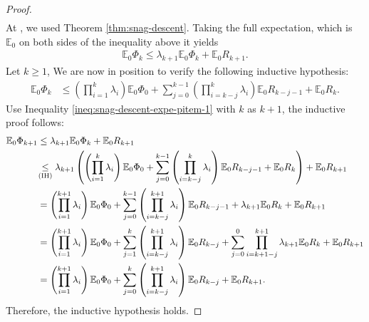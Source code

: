 \documentclass[12pt]{article}
\newcommand{\expect}{\ensuremath{\mathbb E}}
\begin{document}
\begin{proof}
\begin{align*}
            \end{align*}
            At , we used Theorem \ref{thm:snag-descent}. 
            Taking the full expectation, which is $\expect_0$ on both sides of the inequality above it yields 
            \begin{align}\label{ineq:snag-descent-expe-pitem-1}
                \expect_0 \Phi_{k} \le \lambda_{k + 1}\expect_0 \Phi_k + \expect_0 R_{k + 1}. 
            \end{align}
            Let $k \ge 1$, We are now in position to verify the following inductive hypothesis: 
            \begin{align}\tag{IH}
                \expect_0 \Phi_k &\le
                \left(
                    \prod_{i = 1}^k \lambda_i
                \right)\expect_0 \Phi_0 + 
                \sum_{j = 0}^{k - 1}\left(
                    \prod_{i = k - j}^k \lambda_i
                \right)\expect_0 R_{k - j - 1}
                + \expect_0 R_k.
            \end{align}
            Use Inequality \ref{ineq:snag-descent-expe-pitem-1} with $k$ as $k + 1$, the inductive proof follows: 
            \begin{align*}
                \expect_0 \Phi_{k + 1} &\le 
                \lambda_{k + 1}\expect_0\Phi_k 
                + \expect_0 R_{k + 1}
                \\
                &\hspace{-0.2em}\underset{\text{(IH)}}{\le} \lambda_{k + 1}\left(
                    \left(
                        \prod_{i = 1}^k \lambda_i
                    \right)\expect_0 \Phi_0 
                    + \sum_{j = 0}^{k - 1}\left(
                        \prod_{i = k - j}^k \lambda_i
                    \right)\expect_0 R_{k - j - 1}
                    + \expect_0 R_k
                \right) 
                + \expect_0 R_{k + 1}
                \\
                &= \left(
                    \prod_{i = 1}^{k + 1} \lambda_i
                \right)\expect_0 \Phi_0
                + \sum_{j = 0}^{k - 1}\left(
                    \prod_{i = k - j}^{k + 1}\lambda_i
                \right)\expect_0 R_{k - j - 1}
                + \lambda_{k + 1}\expect_0 R_k 
                + \expect_0 R_{k + 1}
                \\
                &= \left(
                    \prod_{i = 1}^{k + 1} \lambda_i
                \right)\expect_0 \Phi_0
                + \sum_{j = 1}^{k}\left(
                    \prod_{i = k- j}^{k + 1}\lambda_i
                \right)\expect_0 R_{k - j}
                + \sum_{j = 0}^0 \prod_{i = k + 1 - j}^{k + 1}\lambda_{k + 1}\expect_0 R_k 
                + \expect_0 R_{k + 1}
                \\
                &= 
                \left(
                    \prod_{i = 1}^{k + 1} \lambda_i
                \right)\expect_0 \Phi_0
                + \sum_{j = 0}^{k}\left(
                    \prod_{i = k- j}^{k + 1}\lambda_i
                \right)\expect_0 R_{k - j}
                + \expect_0 R_{k + 1}. 
            \end{align*}
            Therefore, the inductive hypothesis holds. 
        \end{proof}
\end{document}
